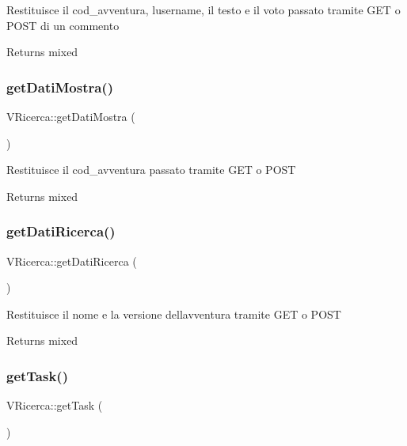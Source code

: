 Restituisce il cod\+\_\+avventura, l\textquotesingle{}username, il testo e il voto passato tramite G\+ET o P\+O\+ST di un commento

\begin{DoxyReturn}{Returns}
mixed 
\end{DoxyReturn}
\mbox{\label{class_v_ricerca_af32f2ee10d133b234eeb8bd3359569a1}} 
\subsubsection{\texorpdfstring{get\+Dati\+Mostra()}{getDatiMostra()}}
{\footnotesize\ttfamily V\+Ricerca\+::get\+Dati\+Mostra (\begin{DoxyParamCaption}{ }\end{DoxyParamCaption})}

Restituisce il cod\+\_\+avventura passato tramite G\+ET o P\+O\+ST

\begin{DoxyReturn}{Returns}
mixed 
\end{DoxyReturn}
\mbox{\label{class_v_ricerca_ac0f1b275ec5c9e97bf01548ee679102a}} 
\subsubsection{\texorpdfstring{get\+Dati\+Ricerca()}{getDatiRicerca()}}
{\footnotesize\ttfamily V\+Ricerca\+::get\+Dati\+Ricerca (\begin{DoxyParamCaption}{ }\end{DoxyParamCaption})}

Restituisce il nome e la versione dell\textquotesingle{}avventura tramite G\+ET o P\+O\+ST

\begin{DoxyReturn}{Returns}
mixed 
\end{DoxyReturn}
\mbox{\label{class_v_ricerca_ae254a1328432be4162826bf9b34035c6}} 
\subsubsection{\texorpdfstring{get\+Task()}{getTask()}}
{\footnotesize\ttfamily V\+Ricerca\+::get\+Task (\begin{DoxyParamCaption}{ }\end{DoxyParamCaption})}

